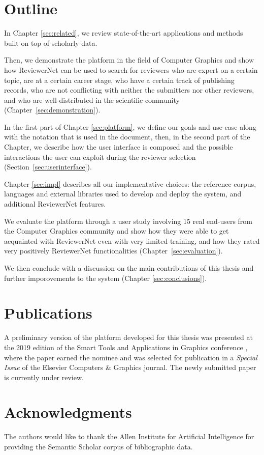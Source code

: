 \section{Outline}

In Chapter \ref{sec:related}, we review state-of-the-art applications and methods built on top of scholarly data.

Then, we demonstrate the platform in the field of Computer Graphics and show how ReviewerNet can be used to search for reviewers who are expert on a certain topic, are at a certain career stage, who have a certain track of publishing records, who are not conflicting with neither the submitters nor other reviewers, and who are well-distributed in the scientific community (Chapter~\ref{sec:demonstration}). 

In the first part of Chapter \ref{sec:platform}, we define our goals and use-case along with the notation that is used in the document, then, in the second part of the Chapter, we describe how the user interface is composed and the possible interactions the user can exploit during the reviewer selection (Section~\ref{sec:userinterface}). 

Chapter \ref{sec:impl} describes all our implementative choices: the reference corpus, languages and external libraries used to develop and deploy the system, and additional ReviewerNet features. 

We evaluate the platform through a user study involving 15 real end-users from the Computer Graphics community and show how they were able to get acquainted with ReviewerNet even with very limited training, and how they rated very positively ReviewerNet functionalities (Chapter~\ref{sec:evaluation}).  

We then conclude with a discussion on the main contributions of this thesis and further imporovements to the system (Chapter \ref{sec:conclusions}).

\section{Publications}

A preliminary version of the platform developed for this thesis was presented at the 2019 edition of the Smart Tools and Applications in Graphics conference \cite{stag19}, where the paper earned the  nominee and was selected for publication in a \emph{Special Issue} of the Elsevier Computers \& Graphics journal. The newly submitted paper is currently under review.

\section*{Acknowledgments}

The authors would like to thank the Allen Institute for Artificial Intelligence for providing the Semantic Scholar corpus of bibliographic data.